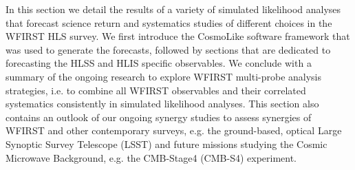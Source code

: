 \newcommand{\nn}{\nonumber}
\newcommand{\vpi}{\mathbf \pi}
\newcommand{\vecd}{\mathbf d}
\newcommand{\matC}{\mathbf C}
\newcommand{\matQ}{\mathbf Q}

\newcommand{\om}{\Omega_\mr m}
\newcommand{\omb}{\Omega_\mr b}
\newcommand{\sig}{\sigma_8}
\newcommand{\ns}{n_s}
\newcommand{\w}{w_0}
\newcommand{\wa}{w_a}

\renewcommand{\d}{{\rm d}}
\newcommand{\pd}{P_{\delta}}
\newcommand{\pe}{P_\mr E}

\newcommand{\vt}{\vartheta}
\newcommand{\vp}{\varphi}
\newcommand{\eps}{\epsilon}
\newcommand{\abs}[1]{| #1 |}
\newcommand{\mr}{\mathrm}

\renewcommand{\d}{{\rm d}}

In this section we detail the results of a variety of simulated likelihood analyses that forecast science return and systematics studies of different choices in the WFIRST HLS survey. We first introduce the CosmoLike software framework that was used to generate the forecasts, followed by sections that are dedicated to forecasting the HLSS and HLIS specific observables. We conclude with a summary of the ongoing research to explore WFIRST multi-probe analysis strategies, i.e. to combine all WFIRST observables and their correlated systematics consistently in simulated likelihood analyses. This section also contains an outlook of our ongoing synergy studies to assess synergies of WFIRST and other contemporary surveys, e.g. the ground-based, optical Large Synoptic Survey Telescope (LSST) and future missions studying the Cosmic Microwave Background, e.g. the CMB-Stage4 (CMB-S4) experiment.

